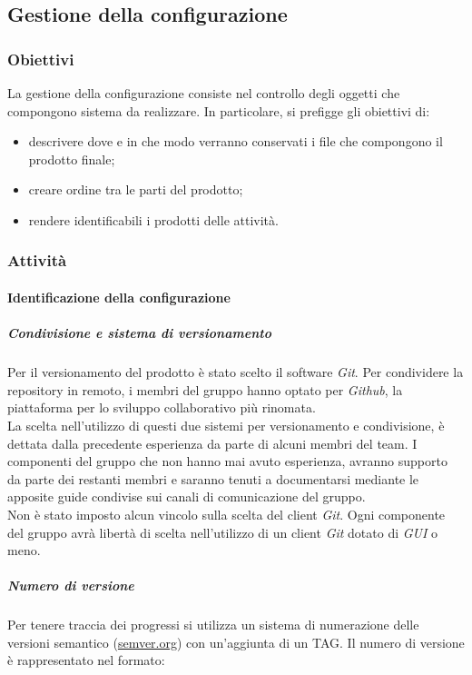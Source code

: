 \subsection{Gestione della configurazione}
\subsubsection{Obiettivi}
La gestione della configurazione consiste nel controllo degli oggetti che compongono sistema da realizzare. In particolare, si prefigge gli obiettivi di:
\begin{itemize}
	\item descrivere dove e in che modo verranno conservati i file che compongono il prodotto finale;
	\item creare ordine tra le parti del prodotto;
	\item rendere identificabili i prodotti delle attività.
\end{itemize}

\subsubsection{Attività}
\paragraph{Identificazione della configurazione}
\subparagraph*{Condivisione e sistema di versionamento}
Per il versionamento del prodotto è stato scelto il software \textit{Git\glos}. Per condividere la repository in remoto, i membri del gruppo hanno optato per \textit{Github\glos}, la piattaforma per lo sviluppo collaborativo più rinomata. \\

\noindent La scelta nell'utilizzo di questi due sistemi per versionamento e condivisione, è dettata dalla precedente esperienza da parte di alcuni membri del team. I componenti del gruppo che non hanno mai avuto esperienza, avranno supporto da parte dei restanti membri e saranno tenuti a documentarsi mediante le apposite guide condivise sui canali di comunicazione del gruppo. \\

\noindent Non è stato imposto alcun vincolo sulla scelta del client \textit{Git\glos}. Ogni componente del gruppo avrà libertà di scelta nell'utilizzo di un client \textit{Git\glo} dotato di \textit{GUI\glo} o meno.

\subparagraph*{Numero di versione}
Per tenere traccia dei progressi si utilizza un sistema di numerazione delle versioni
semantico (\href{https://semver.org/lang/it/}{semver.org}) con un'aggiunta di un TAG.
Il numero di versione è rappresentato nel formato:\\\\

